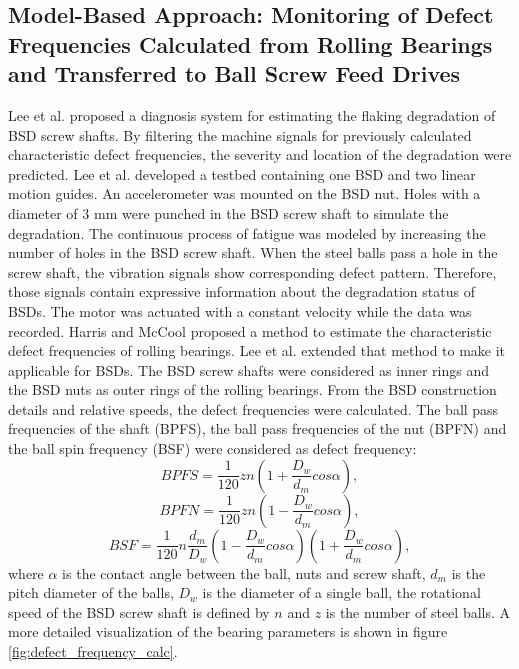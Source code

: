 \subsection{Model-Based Approach: Monitoring of Defect Frequencies Calculated from Rolling Bearings and Transferred to Ball Screw Feed Drives}
Lee et al. \cite{Lee2015} proposed a diagnosis system for estimating the flaking degradation of BSD screw shafts. By filtering the machine signals for previously calculated characteristic defect frequencies, the severity and location of the degradation were predicted. Lee et al. developed a testbed containing one BSD and two linear motion guides. An accelerometer was mounted on the BSD nut. Holes with a diameter of 3 mm were punched in the BSD screw shaft to simulate the degradation. The continuous process of fatigue was modeled by increasing the number of holes in the BSD screw shaft. When the steel balls pass a hole in the screw shaft, the vibration signals show corresponding defect pattern. Therefore, those signals contain expressive information about the degradation status of BSDs. The motor was actuated with a constant velocity while the data was recorded. Harris and McCool \cite{Harris1996} proposed a method to estimate the characteristic defect frequencies of rolling bearings. Lee et al. \cite{Lee2015} extended that method to make it applicable for BSDs. The BSD screw shafts were considered as inner rings and the BSD nuts as outer rings of the rolling bearings. From the BSD construction details and relative speeds, the defect frequencies were calculated. The ball pass frequencies of the shaft (BPFS), the ball pass frequencies of the nut (BPFN) and the ball spin frequency (BSF) were considered as defect frequency: 
\begin{equation}
    BPFS = \frac{1}{120}zn(1+\frac{D_{w}}{d_{m}}cos\alpha),
    \label{eq:defect_frequency}
\end{equation}
\begin{equation}
    BPFN = \frac{1}{120}zn(1-\frac{D_{w}}{d_{m}}cos\alpha),
\end{equation}
\begin{equation}
    BSF = \frac{1}{120}n\frac{d_{m}}{D_{w}} (1-\frac{D_{w}}{d_{m}}cos\alpha)(1+\frac{D_{w}}{d_{m}}cos\alpha) ,
\end{equation}
where $\alpha$ is the contact angle between the ball, nuts and screw shaft, $d_{m}$ is the pitch diameter of the balls, $D_{w}$ is the diameter of a single ball, the rotational speed of the BSD screw shaft is defined by $n$ and $z$ is the number of steel balls. A more detailed visualization of the bearing parameters is shown in figure \ref{fig:defect_frequency_calc}. 

